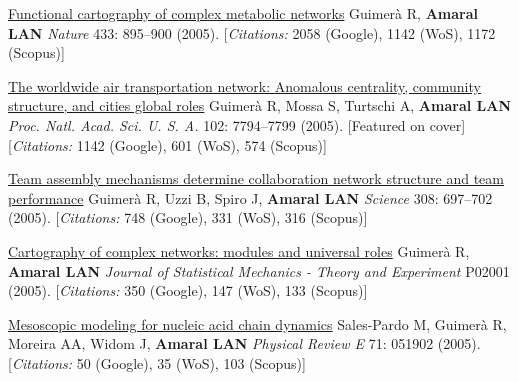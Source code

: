 \NumberedItem{\makebox[0.8cm][r]{[65]}}
\href{/people/amaral/functional-cartography-of-complex-metabolic-networks}
{Functional cartography of complex metabolic networks}
\newline
Guimer\`a R, {\textbf{Amaral LAN}}
\newline
\textit{Nature}
    433:
895--900 (2005).
    [{\em{Citations:}} 2058 (Google), 1142 (WoS), 1172 (Scopus)]
\newline
\Gap
~
\Gap

\NumberedItem{\makebox[0.8cm][r]{[64]}}
\href{/people/amaral/the-worldwide-air-transportation-network-anomalous-centrality-community-structure-and-cities-global-roles}
{The worldwide air transportation network: Anomalous centrality, community structure, and cities global roles}
\newline
Guimer\`a R, Mossa S, Turtschi A, {\textbf{Amaral LAN}}
\newline
\textit{Proc. Natl. Acad. Sci. U. S. A.}
    102:
7794--7799 (2005).
    [Featured on cover]
    [{\em{Citations:}} 1142 (Google), 601 (WoS), 574 (Scopus)]
\newline
\Gap
~
\Gap

\NumberedItem{\makebox[0.8cm][r]{[63]}}
\href{/people/amaral/team-assembly-mechanisms-determine-collaboration-network-structure-and-team-performance}
{Team assembly mechanisms determine collaboration network structure and team performance}
\newline
Guimer\`a R, Uzzi B, Spiro J, {\textbf{Amaral LAN}}
\newline
\textit{Science}
    308:
697--702 (2005).
    [{\em{Citations:}} 748 (Google), 331 (WoS), 316 (Scopus)]
\newline
\Gap
~
\Gap

\NumberedItem{\makebox[0.8cm][r]{[62]}}
\href{/people/amaral/cartography-of-complex-networks-modules-and-universal-roles}
{Cartography of complex networks: modules and universal roles}
\newline
Guimer\`a R, {\textbf{Amaral LAN}}
\newline
\textit{Journal of Statistical Mechanics - Theory and Experiment}
P02001 (2005).
    [{\em{Citations:}} 350 (Google), 147 (WoS), 133 (Scopus)]
\newline
\Gap
~
\Gap

\NumberedItem{\makebox[0.8cm][r]{[61]}}
\href{/people/amaral/mesoscopic-modeling-for-nucleic-acid-chain-dynamics}
{Mesoscopic modeling for nucleic acid chain dynamics}
\newline
Sales-Pardo M, Guimer\`a R, Moreira AA, Widom J, {\textbf{Amaral LAN}}
\newline
\textit{Physical Review E}
    71:
051902 (2005).
    [{\em{Citations:}} 50 (Google), 35 (WoS), 103 (Scopus)]
\newline
\Gap
~
\Gap

